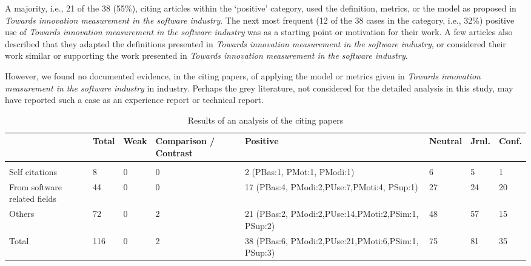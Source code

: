 \documentclass[sigconf,review]{acmart}
\newcommand{\theArticle}{\textit{Towards innovation measurement in the software industry}}
\begin{document}
A majority, i.e., 21 of the 38 (55\%), citing articles within the `positive' category, used the definition, metrics, or the model as proposed in \theArticle. The next most frequent (12 of the 38 cases in the category, i.e., 32\%) positive use of \theArticle{} was as a starting point or motivation for their work. A few articles also described that they adapted the definitions presented in \theArticle{}, or considered their work similar or supporting the work presented in \theArticle. 

However, we found no documented evidence, in the citing papers, of applying the model or metrics given in \theArticle{} in industry. Perhaps the grey literature, not considered for the detailed analysis in this study, may have reported such a case as an experience report or technical report.

\begin{table}
	\caption{Results of an analysis of the citing papers}
	\label{tab:CitationAnalysis}
	\begin{tabular}{p{2.5cm}llp{1.5cm}llll}
			\toprule
		& Total & Weak & Comparison / Contrast & Positive                                            & Neutral & Jrnl. & Conf. \\
		\midrule
		&       &      &                       &                                                     &         &         &            \\
		Self citations               & 8     & 0    & 0                     & 2 (PBas:1, PMot:1, PModi:1)                         & 6       & 5       & 1          \\
		From software related fields & 44    & 0    & 0                     & 17 (PBas:4, PModi:2,PUse:7,PMoti:4, PSup:1)         & 27      & 24      & 20         \\
		Others                       & 72    & 0    & 2                     & 21 (PBas:2, PModi:2,PUse:14,PMoti:2,PSim:1, PSup:2) & 48      & 57      & 15         \\
		Total                        & 116   & 0    & 2                     & 38 (PBas:6, PModi:2,PUse:21,PMoti:6,PSim:1, PSup:3) & 75      & 81      & 35        \\ \bottomrule
	\end{tabular}
\end{table}
\end{document}
